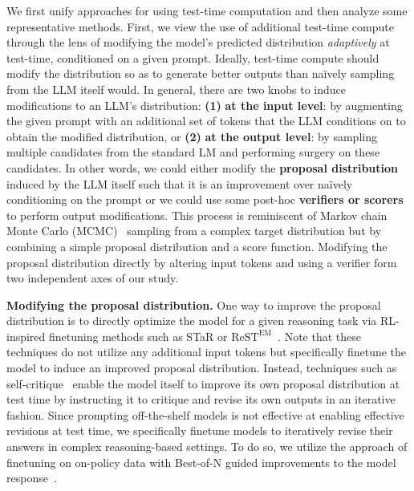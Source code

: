 We first unify approaches for using test-time computation and then analyze some representative methods. First, we view the use of additional test-time compute through the lens of modifying the model's predicted distribution \emph{adaptively} at test-time, conditioned on a given prompt. Ideally, test-time compute should modify the distribution so as to generate better outputs than na\"ively sampling from the LLM itself would. In general, there are two knobs to induce modifications to an LLM's distribution: \textbf{(1)} \textbf{at the input level}: by augmenting the given prompt with an additional set of tokens that the LLM conditions on to obtain the modified distribution, or \textbf{(2)} \textbf{at the output level}: by sampling multiple candidates from the standard LM and performing surgery on these candidates. In other words, we could either modify the \textbf{proposal distribution} induced by the LLM itself such that it is an improvement over na\"ively conditioning on the prompt or we could use some post-hoc \textbf{verifiers or scorers} to perform output modifications. This process is reminiscent of Markov chain Monte Carlo (MCMC)~\citep{andrieu2003introduction} sampling from a complex target distribution but by combining a simple proposal distribution and a score function.
Modifying the proposal distribution directly by altering input tokens and using a verifier form two independent axes of our study.

\textbf{Modifying the proposal distribution.} One way to improve the proposal distribution is to directly optimize the model for a given reasoning task via RL-inspired finetuning methods such as STaR or $\text{ReST}^{\text{EM}}$~\citep{zelikman2022star,singh2024human}. Note that these techniques do not utilize any additional input tokens but specifically finetune the model to induce an improved proposal distribution.
Instead, techniques such as self-critique~\citep{bai2022constitutional,madaan2023selfrefine,du2023improving,saunders2022selfcritiquing} enable the model itself to improve its own proposal distribution at test time by instructing it to critique and revise its own outputs in an iterative fashion. Since prompting off-the-shelf models is not effective at enabling effective revisions at test time, we specifically finetune models to iteratively revise their answers in complex reasoning-based settings. To do so, we utilize the approach of finetuning on on-policy data with Best-of-N guided improvements to the model response~\citep{qu2024recursive}. 

